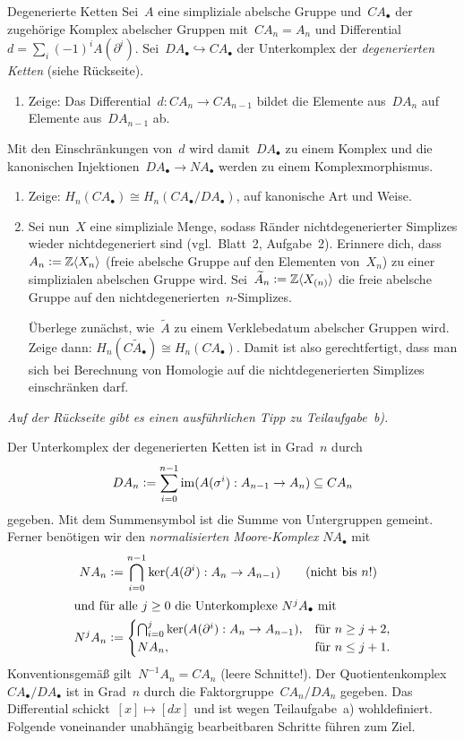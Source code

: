 \documentclass{uebblatt}
\begin{document}
\begin{aufgabe}{Degenerierte Ketten}
Sei~$A$ eine simpliziale abelsche Gruppe und~$CA_\bullet$ der zugehörige
Komplex abelscher Gruppen mit~$CA_n = A_n$ und Differential~$d = \sum_i (-1)^i
A(\partial^i)$. Sei~$DA_\bullet \hookrightarrow CA_\bullet$ der Unterkomplex
der \emph{degenerierten Ketten} (siehe Rückseite).
\begin{enumerate}
\item Zeige: Das Differential~$d : CA_n \to CA_{n-1}$ bildet die Elemente
aus~$DA_n$ auf Elemente aus~$DA_{n-1}$ ab.
\end{enumerate}
Mit den Einschränkungen von~$d$ wird damit~$DA_\bullet$ zu einem Komplex und die
kanonischen Injektionen~$DA_\bullet \to NA_\bullet$ werden zu einem Komplexmorphismus.
\begin{enumerate}
\addtocounter{enumi}{1}
\item Zeige: $H_n(CA_\bullet) \cong H_n(CA_\bullet/DA_\bullet)$, auf kanonische
Art und Weise.
\item Sei nun~$X$ eine simpliziale Menge, sodass Ränder nichtdegenerierter
Simplizes wieder nichtdegeneriert sind (vgl.~Blatt~2, Aufgabe~2). Erinnere
dich, dass~$A_n \vcentcolon= \mathbb{Z}\langle X_n \rangle$ (freie abelsche Gruppe auf den
Elementen von~$X_n$) zu einer simplizialen abelschen Gruppe wird.
Sei~$\widetilde A_n \vcentcolon= \mathbb{Z}\langle X_{(n)} \rangle$ die freie abelsche Gruppe
auf den nichtdegenerierten~$n$-Simplizes.

Überlege zunächst, wie~$\widetilde A$ zu einem Verklebedatum abelscher
Gruppen wird.
Zeige dann: $H_n(C\widetilde A_\bullet) \cong H_n(CA_\bullet)$. Damit ist also
gerechtfertigt, dass man sich bei Berechnung von Homologie auf die
nichtdegenerierten Simplizes einschränken darf.
\end{enumerate}

\emph{Auf der Rückseite gibt es einen ausführlichen Tipp zu Teilaufgabe~b).}
\end{aufgabe}

Der Unterkomplex der degenerierten Ketten ist in Grad~$n$ durch
\[ DA_n \vcentcolon= \sum_{i=0}^{n-1} \operatorname{im}(A(\sigma^i) : A_{n-1} \to A_n) \subseteq
CA_n \]
gegeben. Mit dem Summensymbol ist die Summe von Untergruppen gemeint. Ferner
benötigen wir den \emph{normalisierten Moore-Komplex} $NA_\bullet$ mit
\begin{align*}
  NA_n &\vcentcolon= \bigcap_{i=0}^{n-1} \operatorname{ker}(A(\partial^i) : A_n \to A_{n-1})
\qquad\text{(nicht bis~$n$!)} \\
\intertext{und für alle~$j \geq 0$ die Unterkomplexe~$N^jA_\bullet$ mit}
  N^jA_n &\vcentcolon= \begin{cases}
  \bigcap_{i=0}^j \operatorname{ker}(A(\partial^i) : A_n \to A_{n-1}), &
  \text{für~$n \geq j + 2$,} \\
  NA_n, &
  \text{für~$n \leq j + 1$.} \end{cases}
\end{align*}
Konventionsgemäß gilt~$N^{-1}A_n = CA_n$ (leere Schnitte!).
Der Quotientenkomplex~$CA_\bullet/DA_\bullet$ ist in Grad~$n$ durch die
Faktorgruppe~$CA_n/DA_n$ gegeben. Das Differential schickt~$[x] \mapsto [dx]$
und ist wegen Teilaufgabe~a) wohldefiniert. Folgende voneinander unabhängig
bearbeitbaren Schritte führen zum Ziel.
\end{document}
